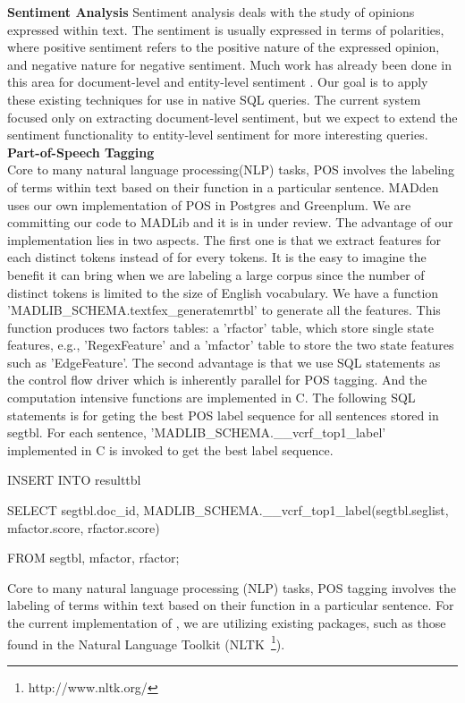 \noindent
\textbf{Sentiment Analysis}
Sentiment analysis deals with the study of opinions expressed within text. 
The sentiment is usually expressed in terms of polarities, where positive
sentiment refers to the positive nature of the expressed opinion, and negative
nature for negative sentiment. Much work has already been done in this
area for document-level and entity-level sentiment \cite{zhang2011combining, 
o2010tweets}. Our goal is to apply these existing techniques for use in 
native SQL queries. The current {\system} system focused only on extracting
document-level sentiment, but we expect to extend the sentiment functionality to 
entity-level sentiment for more interesting queries.\\

\noindent
\textbf{Part-of-Speech Tagging}\\

Core to many natural language processing(NLP) tasks, POS involves the labeling of
terms within text based on their function in a particular sentence. MADden uses our
own implementation of POS in Postgres and Greenplum. We are committing our code to
MADLib and it is in under review. The advantage of our implementation lies in two
aspects. The first one is that we extract features for each distinct tokens instead of
for every tokens.  It is the easy to imagine the benefit it can bring when we are
labeling a large corpus since the number of distinct tokens is limited to the size
of English vocabulary. We have a function 'MADLIB\_SCHEMA.textfex\_generatemrtbl' to
generate all the features. This function produces two factors tables: a 'rfactor'
table, which store single state features, e.g., 'RegexFeature' and a 'mfactor'
table to store the two state features such as 'EdgeFeature'.  The second advantage is
that we use SQL statements as the control flow driver which is inherently
parallel for POS tagging. And the computation intensive functions are implemented in C. The
following SQL statements is for geting the best POS label sequence for all sentences
stored in segtbl.  For each sentence, 'MADLIB\_SCHEMA.\_\_vcrf\_top1\_label' implemented in
C is invoked to get the best label sequence.

INSERT INTO resulttbl

SELECT   segtbl.doc\_id, MADLIB\_SCHEMA.\_\_vcrf\_top1\_label(segtbl.seglist, 
         mfactor.score, rfactor.score) 

FROM   segtbl, mfactor, rfactor;

Core to many natural language processing (NLP) tasks, POS tagging
involves the labeling of terms within text based on their function in a
particular sentence. For the current implementation of {\system}, we are 
utilizing existing packages, such as those found in the Natural Language 
Toolkit (NLTK~\footnote{http://www.nltk.org/}).


